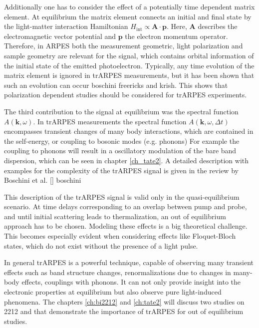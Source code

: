 Additionally one has to consider the effect of a potentially time dependent matrix element.
At equilibrium the matrix element connects an initial and final state by the light-matter interaction Hamiltonian $H_\text{int} \propto \mathbf{A\cdot\mathbf{p}}$.
Here, $\mathbf{A}$ describes the electromagnetic vector potential and $\mathbf{p}$ the electron momentum operator.
Therefore, in ARPES both the measurement geometric, light polarization and sample geometry are relevant for the signal, which contains orbital information of the initial state of the emitted photoelectron.
Typically, any time evolution of the matrix element is ignored in trARPES measurements, but it has been shown that such an evolution can occur \cite{} boschini freericks and krish.
This shows that polarization dependent studies should be considered for trARPES experiments.

The third contribution to the signal at equilibrium was the spectral function $A(\mathbf{k}, \omega)$.
In trARPES measurements the spectral function $A(\mathbf{k}, \omega, \Delta t)$ encompasses transient changes of many body interactions, which are contained in the self-energy, or coupling to bosonic modes (e.g. phonons)
For example the coupling to phonons will result in a oscillatory modulation of the bare band dispersion, which can be seen in chapter \ref{ch_tate2}.
A detailed description with examples for the complexity of the trARPES signal is given in the review by Boschini et al. \ref{} boschini

This description of the trARPES signal is valid only in the quasi-equilibrium scenario.
At time delays corresponding to an overlap between pump and probe, and until initial scattering leads to thermalization, an out of equilibrium approach has to be chosen.
Modeling these effects is a big theoretical challenge.
This becomes especially evident when considering effects like Floquet-Bloch states, which do not exist without the presence of a light pulse.

In general trARPES is a powerful technique, capable of observing many transient effects such as band structure changes, renormalizations due to changes in many-body effects, couplings with phonons.
It can not only provide insight into the electronic properties at equilibrium but also observe pure light-induced phenomena.
The chapters \ref{ch:bi2212} and \ref{ch:tate2} will discuss two studies on 2212 and  that demonstrate the importance of trARPES for out of equilibrium studies.